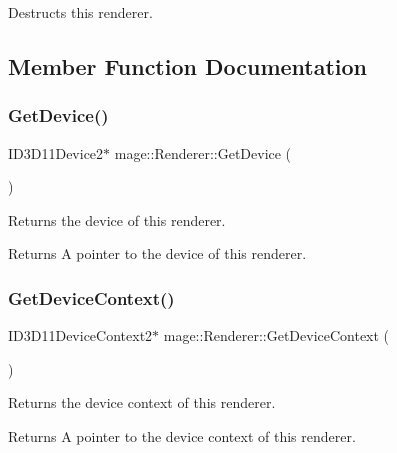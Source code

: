 Destructs this renderer. 

\subsection{Member Function Documentation}
\hypertarget{classmage_1_1_renderer_a38522d4b6933ef8f9ef5e46b713bdc95}{}\label{classmage_1_1_renderer_a38522d4b6933ef8f9ef5e46b713bdc95} 
\subsubsection{\texorpdfstring{Get\+Device()}{GetDevice()}}
{\footnotesize\ttfamily I\+D3\+D11\+Device2$\ast$ mage\+::\+Renderer\+::\+Get\+Device (\begin{DoxyParamCaption}{ }\end{DoxyParamCaption})}

Returns the device of this renderer.

\begin{DoxyReturn}{Returns}
A pointer to the device of this renderer. 
\end{DoxyReturn}
\hypertarget{classmage_1_1_renderer_aa212ed67007115da62b6338f75e4eb75}{}\label{classmage_1_1_renderer_aa212ed67007115da62b6338f75e4eb75} 
\subsubsection{\texorpdfstring{Get\+Device\+Context()}{GetDeviceContext()}}
{\footnotesize\ttfamily I\+D3\+D11\+Device\+Context2$\ast$ mage\+::\+Renderer\+::\+Get\+Device\+Context (\begin{DoxyParamCaption}{ }\end{DoxyParamCaption})}

Returns the device context of this renderer.

\begin{DoxyReturn}{Returns}
A pointer to the device context of this renderer. 
\end{DoxyReturn}
\hypertarget{classmage_1_1_renderer_aafed50e7e14ca597541c091941351929}{}\label{classmage_1_1_renderer_aafed50e7e14ca597541c091941351929} 
